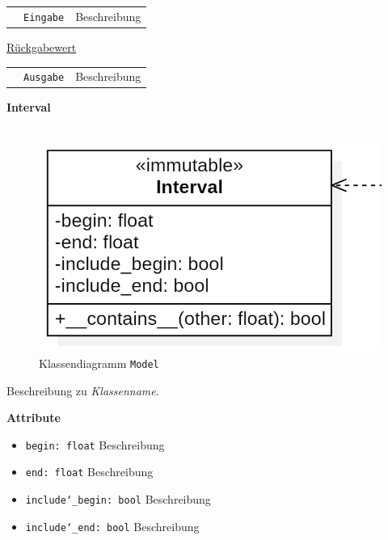 \documentclass{article}
\begin{document}
\begin{itemize}
\begin{tabular}{lll}
 & \texttt{Eingabe} & Beschreibung \\
\end{tabular}

\underline{{Rückgabewert}}

\begin{tabular}{lll}
 & \texttt{Ausgabe} & Beschreibung \\
\end{tabular}
\end{itemize}


\newpage
\textbf{\large{Interval}}\\\\
\begin{figure}[H]%
    \centering
    \includegraphics[width=13cm]{entwurf/Entwurf_dokument/img/cls/model/Interval.png}
    \caption{Klassendiagramm \texttt{Model}}
\end{figure}

Beschreibung zu \textit{Klassenname}.
\newline \newline

\textbf{{Attribute}}
\begin{itemize}
\item \texttt{begin: float} \newline Beschreibung
\item \texttt{end: float} \newline Beschreibung
\item \texttt{include\char`_begin: bool} \newline Beschreibung
\item \texttt{include\char`_end: bool} \newline Beschreibung
\\\\
\end{itemize}
\end{document}
